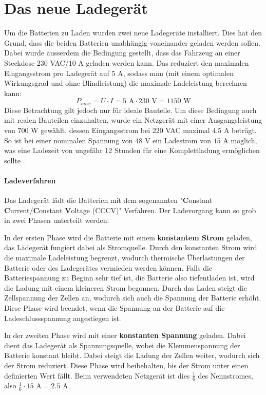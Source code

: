 \section{Das neue Ladegerät}
Um die Batterien zu Laden wurden zwei neue Ladegeräte installiert. Dies hat den Grund, dass die beiden Batterien unabhängig voneinander geladen werden sollen. Dabei wurde ausserdem die Bedingung gestellt, dass das Fahrzeug an einer Steckdose $230$ VAC/$10$ A geladen werden kann. Das reduziert den maximalen Eingangsstrom pro Ladegerät auf $5$ A, sodass man (mit einem optimalen Wirkungsgrad und ohne Blindleistung) die maximale Ladeleistung berechnen kann:
\begin{equation*}
	P_{max}=U\cdot I=5\text{ A}\cdot230\text{ V}=1150\text{ W}
\end{equation*}
Diese Betrachtung gilt jedoch nur für ideale Bauteile. Um diese Bedingung auch mit realen Bauteilen einzuhalten, wurde ein Netzgerät mit einer Ausgangsleistung von $700$ W gewählt, dessen Eingangsstrom bei $220$ VAC maximal $4.5$ A beträgt. So ist bei einer nominalen Spannung von $48$ V ein Ladestrom von $15$ A möglich, was eine Ladezeit von ungefähr 12 Stunden für eine Komplettladung ermöglichen sollte \cite{ladegeraet}.

\paragraph{Ladeverfahren}
Das Ladegerät lädt die Batterien mit dem sogenannten "\textbf{C}onstant \textbf{C}urrent/\textbf{C}onstant \textbf{V}oltage (CCCV)" Verfahren. Der Ladevorgang kann so grob in zwei Phasen unterteilt werden:

In der ersten Phase wird die Batterie mit einem \textbf{konstantem Strom} geladen, das Lädegerät fungiert dabei als Stromquelle. Durch den konstanten Strom wird die maximale Ladeleistung begrenzt, wodurch thermische Überlastungen der Batterie oder des Ladegerätes vermieden werden können. Falls die Batteriespannung zu Beginn sehr tief ist, die Batterie also tiefentladen ist, wird die Ladung mit einem kleineren Strom begonnen. Durch das Laden steigt die Zellspannung der Zellen an, wodurch sich auch die Spannung der Batterie erhöht. Diese Phase wird beendet, wenn die Spannung an der Batterie auf die Ladeschlussspannung angestiegen ist.

In der zweiten Phase wird mit einer \textbf{konstanten Spannung} geladen. Dabei dient das Ladegerät als Spannungsquelle, wobei die Klemmenspannung der Batterie konstant bleibt. Dabei steigt die Ladung der Zellen weiter, wodurch sich der Strom reduziert. Diese Phase wird beibehalten, bis der Strom unter einen definierten Wert fällt. Beim verwendeten Netzgerät ist dies $\frac{1}{6}$ des Nennstromes, also $\frac{1}{6}\cdot 15\text{ A}=2.5\text{ A}$.

